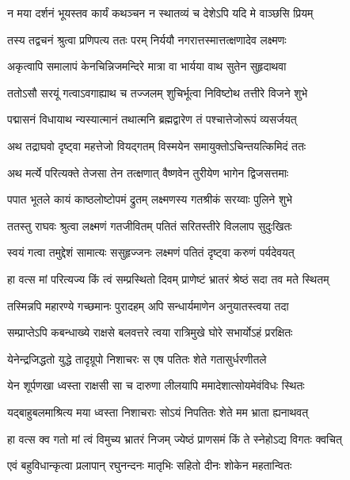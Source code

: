 \twolineshloka
{न मया दर्शनं भूयस्तव कार्यं कथञ्चन}
{न स्थातव्यं च देशेऽपि यदि मे वाञ्छसि प्रियम्}%

\twolineshloka
{तस्य तद्वचनं श्रुत्वा प्रणिपत्य ततः परम्}
{निर्ययौ नगरात्तस्मात्तत्क्षणादेव लक्ष्मणः}%

\twolineshloka
{अकृत्वापि समालापं केनचिन्निजमन्दिरे}
{मात्रा वा भार्यया वाथ सुतेन सुहृदाथवा}%

\twolineshloka
{ततोऽसौ सरयूं गत्वाऽवगाह्याथ च तज्जलम्}
{शुचिर्भूत्वा निविष्टोथ तत्तीरे विजने शुभे}%

\twolineshloka
{पद्मासनं विधायाथ न्यस्यात्मानं तथात्मनि}
{ब्रह्मद्वारेण तं पश्चात्तेजोरूपं व्यसर्जयत्}%

\twolineshloka
{अथ तद्राघवो दृष्ट्वा महत्तेजो वियद्गतम्}
{विस्मयेन समायुक्तोऽचिन्तयत्किमिदं ततः}%

\twolineshloka
{अथ मर्त्ये परित्यक्ते तेजसा तेन तत्क्षणात्}
{वैष्णवेन तुरीयेण भागेन द्विजसत्तमाः}%

\twolineshloka
{पपात भूतले कायं काष्ठलोष्टोपमं द्रुतम्}
{लक्ष्मणस्य गतश्रीकं सरय्वाः पुलिने शुभे}%

\twolineshloka
{ततस्तु राघवः श्रुत्वा लक्ष्मणं गतजीवितम्}
{पतितं सरितस्तीरे विललाप सुदुःखितः}%

\twolineshloka
{स्वयं गत्वा तमुद्देशं सामात्यः ससुहृज्जनः}
{लक्ष्मणं पतितं दृष्ट्वा करुणं पर्यदेवयत्}%

\twolineshloka
{हा वत्स मां परित्यज्य किं त्वं सम्प्रस्थितो दिवम्}
{प्राणेष्टं भ्रातरं श्रेष्ठं सदा तव मते स्थितम्}%

\twolineshloka
{तस्मिन्नपि महारण्ये गच्छमानः पुरादहम्}
{अपि सन्धार्यमाणेन अनुयातस्त्वया तदा}%

\twolineshloka
{सम्प्राप्तेऽपि कबन्धाख्ये राक्षसे बलवत्तरे}
{त्वया रात्रिमुखे घोरे सभार्योऽहं प्ररक्षितः}%

\twolineshloka
{येनेन्द्रजिद्धतो युद्धे तादृग्रूपो निशाचरः}
{स एष पतितः शेते गतासुर्धरणीतले}%

\twolineshloka
{येन शूर्पणखा ध्वस्ता राक्षसी सा च दारुणा}
{लीलयापि ममादेशात्सोयमेवंविधः स्थितः}%

\twolineshloka
{यद्बाहुबलमाश्रित्य मया ध्वस्ता निशाचराः}
{सोऽयं निपतितः शेते मम भ्राता ह्यनाथवत्}%

\twolineshloka
{हा वत्स क्व गतो मां त्वं विमुच्य भ्रातरं निजम्}
{ज्येष्ठं प्राणसमं किं ते स्नेहोऽद्य विगतः क्वचित्}%


\twolineshloka
{एवं बहुविधान्कृत्वा प्रलापान् रघुनन्दनः}
{मातृभिः सहितो दीनः शोकेन महतान्वितः}%

